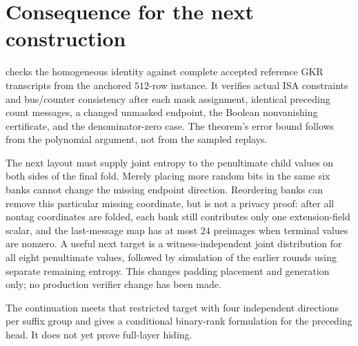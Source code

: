 \documentclass[11pt]{article}
\begin{document}
\section{Consequence for the next construction}

 checks the homogeneous identity against complete accepted reference GKR transcripts from the anchored $512$-row instance. It verifies actual ISA constraints and bus/counter consistency after each mask assignment, identical preceding count messages, a changed unmasked endpoint, the Boolean nonvanishing certificate, and the denominator-zero case. The theorem's error bound follows from the polynomial argument, not from the sampled replays.

The next layout must supply joint entropy to the penultimate child values on both sides of the final fold. Merely placing more random bits in the same six banks cannot change the missing endpoint direction. Reordering banks can remove this particular missing coordinate, but is not a privacy proof: after all nontag coordinates are folded, each bank still contributes only one extension-field scalar, and the last-message map has at most $24$ preimages when terminal values are nonzero. A useful next target is a witness-independent joint distribution for all eight penultimate values, followed by simulation of the earlier rounds using separate remaining entropy. This changes padding placement and generation only; no production verifier change has been made.

The continuation  meets that restricted target with four independent directions per suffix group and gives a conditional binary-rank formulation for the preceding head. It does not yet prove full-layer hiding.
\end{document}
